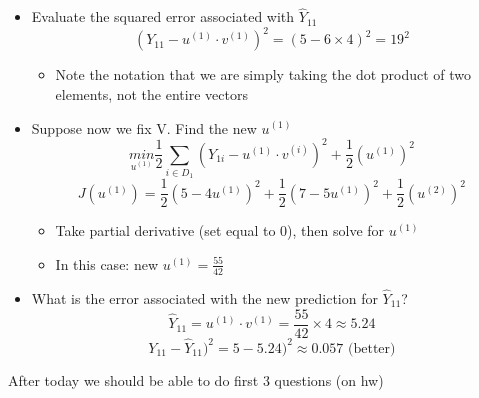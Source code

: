 \documentclass[10pt, oneside]{article}
\begin{document}
\begin{itemize}
    \item Evaluate the squared error associated with $\hat Y_{11}$
    \[(Y_{11} - u^{(1)} \cdot v^{(1)})^2 = (5-6\times 4)^2 = 19^2\]
    \begin{itemize}
        \item Note the notation that we are simply taking the dot product of two elements, not the entire vectors
    \end{itemize} 
    \item Suppose now we fix V. Find the new $u^{(1)}$
    \[\underset{u^{(1)}}{min} \frac{1}{2}\sum_{i\in D_1} (Y_{1i} - u^{(1)}\cdot v^{(i)})^2 + \frac{1}{2}(u^{(1)} )^2\]
    \[J(u^{(1)}) = \frac{1}{2} (5-4u^{(1)})^2 + \frac{1}{2} (7-5u^{(1)})^2 + \frac{1}{2}(u^{(2)})^2\]
    \begin{itemize}
        \item Take partial derivative (set equal to 0), then solve for $u^{(1)}$
        \item In this case: new $u^{(1)} = \frac{55}{42}$
    \end{itemize}
    \item What is the error associated with the new prediction for $\hat Y_{11}$?
    \[\hat Y_{11} = u^{(1)} \cdot v^{(1)} = \frac{55}{42}\times 4 \approx 5.24\]
    \[Y_{11} - \hat Y_{11})^2 = 5- 5.24)^2 \approx 0.057 \text{ (better)}\]
\end{itemize}

After today we should be able to do first 3 questions (on hw)
\end{document}
